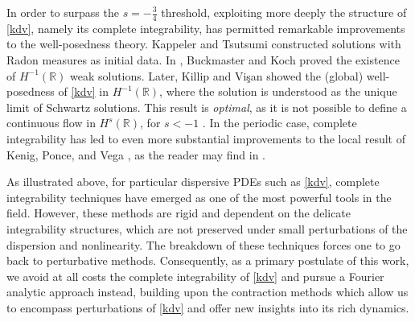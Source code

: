 \documentclass[a4paper,
11pt,  reqno]{amsart}
\newcommand{\5}{\textup{V}}
\theoremstyle{remark}
\newcommand{\R}{\mathbb{R}}
\numberwithin{equation}{section}
\numberwithin{theorem}{section}
\begin{document}
\medskip

In order to surpass the $s=-\frac34$ threshold, exploiting more deeply the structure of \eqref{kdv}, namely its complete integrability, has
permitted remarkable improvements to the well-posedness theory. Kappeler \cite{Kappeler_rough} and Tsutsumi \cite{Tsutsumi_kdv_measures} constructed solutions with Radon measures as initial data. In \cite{BuckmasterKoch}, Buckmaster and Koch proved the existence of $H^{-1}(\R)$ weak solutions. Later, Killip and Vi\c{s}an \cite{KillipVisan_kdv} showed the (global) well-posedness of \eqref{kdv} in $H^{-1}(\R)$, where the solution is understood as the unique limit of Schwartz solutions. This result is \emph{optimal}, as it is not possible to define a continuous flow in $H^s(\R)$, for $s<-1$ \cite{Molinet_ill_line}. In the periodic case, complete integrability has led to even more substantial improvements to the local result of Kenig, Ponce, and Vega \cite{kpv_bilin}, {as the reader may find in }\cite{KMMT16, KappelerMolnar18, KT06, KillipVisan_kdv}.


	\medskip


As illustrated above, for particular dispersive PDEs such as \eqref{kdv}, complete integrability techniques
have emerged as one of the most powerful tools in the field.
However, these methods are rigid and dependent on the delicate integrability structures, which are not preserved under small perturbations of the dispersion and nonlinearity.
The breakdown of these techniques forces one to go back to perturbative methods.
Consequently,
as a primary postulate of this work, we
avoid at all costs the complete integrability of \eqref{kdv} and pursue a Fourier analytic approach instead,
building upon the contraction methods which allow us to encompass perturbations of \eqref{kdv} and offer new insights into its rich dynamics.





\medskip
\end{document}
